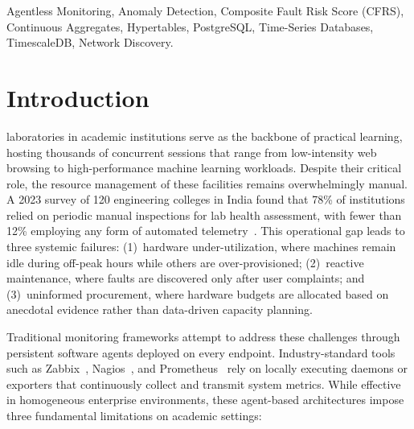 \documentclass{ieeeaccess}
\begin{document}
\begin{keywords}
Agentless Monitoring, Anomaly Detection, Composite Fault Risk Score (CFRS), Continuous Aggregates, Hypertables, PostgreSQL, Time-Series Databases, TimescaleDB, Network Discovery.
\end{keywords}

\titlepgskip=-15pt

\maketitle

\section{Introduction}
\label{sec:introduction}
 laboratories in academic institutions serve as the backbone of practical learning, hosting thousands of concurrent sessions that range from low-intensity web browsing to high-performance machine learning workloads. Despite their critical role, the resource management of these facilities remains overwhelmingly manual. A 2023 survey of 120 engineering colleges in India found that 78\% of institutions relied on periodic manual inspections for lab health assessment, with fewer than 12\% employing any form of automated telemetry~\cite{distributed_monitoring}. This operational gap leads to three systemic failures: (1)~hardware under-utilization, where machines remain idle during off-peak hours while others are over-provisioned; (2)~reactive maintenance, where faults are discovered only after user complaints; and (3)~uninformed procurement, where hardware budgets are allocated based on anecdotal evidence rather than data-driven capacity planning.

Traditional monitoring frameworks attempt to address these challenges through persistent software agents deployed on every endpoint. Industry-standard tools such as Zabbix~\cite{zabbix}, Nagios~\cite{nagios}, and Prometheus~\cite{prometheus} rely on locally executing daemons or exporters that continuously collect and transmit system metrics. While effective in homogeneous enterprise environments, these agent-based architectures impose three fundamental limitations on academic settings:
\end{document}

